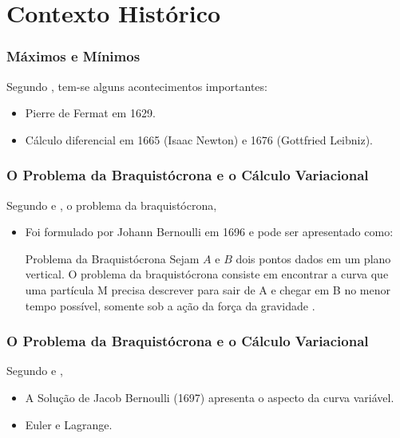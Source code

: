 \documentclass{beamer}
\begin{document}
	\section{Contexto Histórico}

	\begin{frame}
		\frametitle{Máximos e Mínimos}
		\justify
	
		Segundo , tem-se alguns acontecimentos importantes:
		\begin{itemize}
			\justifying
		    \item Pierre de Fermat em 1629.
		    \pause
		    \item Cálculo diferencial em 1665 (Isaac Newton) e 1676 (Gottfried Leibniz).
		\end{itemize}
	\end{frame}

	\begin{frame}
		\frametitle{O Problema da Braquistócrona e o Cálculo Variacional}
		\justify
	
		Segundo  e , o problema da braquistócrona,
		\begin{itemize}
			\item Foi formulado por Johann Bernoulli em 1696 e pode ser apresentado como:
			\begin{block}{Problema da Braquistócrona}
				Sejam $A$ e $B$ dois pontos dados em um plano vertical. O problema da braquistócrona consiste em encontrar a curva que uma partícula M precisa descrever para sair de A e chegar em B no menor tempo possível, somente sob a ação da força da gravidade \cite[p. 3]{calcvar}.
			\end{block}
		\end{itemize}
	\end{frame}

	\begin{frame}
		\frametitle{O Problema da Braquistócrona e o Cálculo Variacional}
		\justify

		Segundo  e \citeonline{hist_still},
		\begin{itemize}
			\item A Solução de Jacob Bernoulli (1697) apresenta o aspecto da curva variável.
			\pause
		
			\item Euler e Lagrange.
		\end{itemize}
	\end{frame}
	
\end{document}
